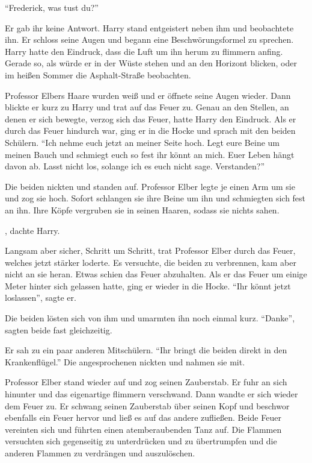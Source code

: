 \enquote{Frederick, was tust du?}

Er gab ihr keine Antwort. Harry stand entgeistert neben ihm und beobachtete ihn. Er schloss seine Augen und begann eine Beschwörungsformel zu sprechen. Harry hatte den Eindruck, dass die Luft um ihn herum zu flimmern anfing. Gerade so, als würde er in der Wüste stehen und an den Horizont blicken, oder im heißen Sommer die Asphalt-Straße beobachten.

Professor Elbers Haare wurden weiß und er öffnete seine Augen wieder. Dann blickte er kurz zu Harry und trat auf das Feuer zu. Genau an den Stellen, an denen er sich bewegte, verzog sich das Feuer, hatte Harry den Eindruck. Als er durch das Feuer hindurch war, ging er in die Hocke und sprach mit den beiden Schülern. \enquote{Ich nehme euch jetzt an meiner Seite hoch. Legt eure Beine um meinen Bauch und schmiegt euch so fest ihr könnt an mich. \gst Euer Leben hängt davon ab. Lasst nicht los, solange ich es euch nicht sage. Verstanden?}

Die beiden nickten und standen auf. Professor Elber legte je einen Arm um sie und zog sie hoch. Sofort schlangen sie ihre Beine um ihn und schmiegten sich fest an ihn. Ihre Köpfe vergruben sie in seinen Haaren, sodass sie nichts sahen.

, dachte Harry.

Langsam aber sicher, Schritt um Schritt, trat Professor Elber durch das Feuer, welches jetzt stärker loderte. Es versuchte, die beiden zu verbrennen, kam aber nicht an sie heran. Etwas schien das Feuer abzuhalten. Als er das Feuer um einige Meter hinter sich gelassen hatte, ging er wieder in die Hocke. \enquote{Ihr könnt jetzt loslassen}, sagte er.

Die beiden lösten sich von ihm und umarmten ihn noch einmal kurz. \enquote{Danke}, sagten beide fast gleichzeitig.

Er sah zu ein paar anderen Mitschülern. \enquote{Ihr bringt die beiden direkt in den Krankenflügel.} Die angesprochenen nickten und nahmen sie mit.

Professor Elber stand wieder auf und zog seinen Zauberstab. Er fuhr an sich hinunter und das eigenartige flimmern verschwand. Dann wandte er sich wieder dem Feuer zu. Er schwang seinen Zauberstab über seinen Kopf und beschwor ebenfalls ein Feuer hervor und ließ es auf das andere zufließen. Beide Feuer vereinten sich und führten einen atemberaubenden Tanz auf. Die Flammen versuchten sich gegenseitig zu unterdrücken und zu übertrumpfen und die anderen Flammen zu verdrängen und auszulöschen.

